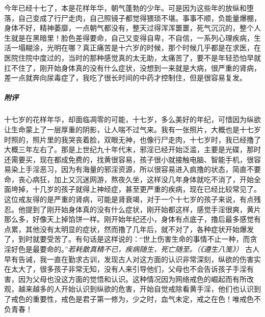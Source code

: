 \begin{case}
    今年已经十七了，本是花样年华，朝气蓬勃的少年。可是因为这些年的放纵和堕落，自己变成了行尸走肉，自己照镜子都觉得猥琐不堪。事事不顺，负能量爆棚，身体不好，精神萎靡，一点朝气都没有，整天过得浑浑噩噩，死气沉沉的，整个人生就是在黑暗里！脸色差得要命，自己又变得自卑，不自信，一系列心理疾病，生活一塌糊涂，光明在哪？真正痛苦是十六岁的时候，那个时候几乎都是在求医，在医院住院中度过的，当时的那种感觉真的太无助，太痛苦了，要不是年轻恐怕早就扛不住了，刚开始身体真的没有什么症状，没想到一来就是大病，很严重的肾病，差一点就奔向尿毒症了，我吃了很长时间的中药才控制住，但是很容易复发。
    \subparagraph{附评} 十七岁的花样年华，却面临凋零的可能，十七岁，多么美好的年纪，可惜因为纵欲让生命蒙上了一层厚重的阴影，让人喘不过气来。我有一张照片，大概也是十七岁时照的，照片里的我哭丧着脸，双眼无神，也像行尸走肉，十七岁时，我已经撸了大概三年左右了。那是上世纪九十年代末，邪淫已经开始泛滥，主要是光碟，那时还需要买，现在都成免费的，找黄很容易，孩子很小就接触电脑、智能手机，很容易染上手淫恶习，因为有海量的邪淫资源，所以很容易进入疯撸的状态，简直不要命，丧心病狂，加上又沉迷网游，熬夜久坐，这样没几年身体就吃不消了，开始全面垮掉，十几岁的孩子就得上神经症，甚至更严重的疾病，现在已经比较常见了。这位戒友得的是严重的肾病，可能是肾衰竭，对于一个十七岁的孩子来说，有点残忍。他提到了刚开始身体真的没有什么症状，刚开始都这样，感觉手淫很爽，黄片那么多，好像天上掉馅饼一样。刚开始年纪还小，身体有点底子，撸后最多感觉有点累，其他没有太明显的症状，然而撸了几年后，就不对了，各种症状开始爆发了，到时就要受苦了。有句话是这样说的：“世上伤害生命的事情不止一种，而贪淫好色是最要命的。”\textit{若耗散真精不已，疾病随生，死亡随至。（《遵生八笺》）} 古人早有告诫，我一直在勤求古训，发现古人对这方面的认识非常深刻，纵欲的伤害实在太大了，很多孩子非常无知，没有人来引导他们，父母也不会告诉孩子手淫有害，因为父母也没这方面的觉悟和认识。这种情况因为网络戒色的崛起而有所改观，越来越多的人开始认识到纵欲的危害，开始自觉戒除看黄手淫，他们也认识到了戒色的重要性，戒色是君子第一修为，少之时，血气未定，戒之在色！唯戒色不负青春！
\end{case}

